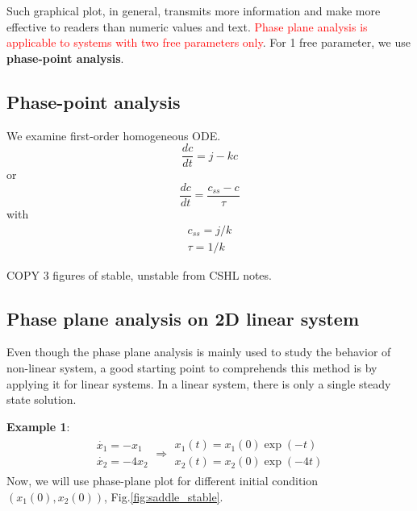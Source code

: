 
Such graphical plot, in general, transmits more information and make
more effective to readers than numeric values and text.
\textcolor{red}{Phase plane analysis is applicable to systems with two
  free parameters only}.
For 1 free parameter, we use {\bf phase-point analysis}.

\subsection{Phase-point analysis}
\label{sec:phase-point-analysis}

We examine first-order homogeneous ODE.
\begin{equation}
  \label{eq:667}
  \frac{dc}{dt} = j - kc
\end{equation}
or 
\begin{equation}
  \label{eq:669}
  \frac{dc}{dt} = \frac{c_{ss}-c}{\tau}
\end{equation}
with 
\begin{eqnarray*}
  c_{ss} = j/k \\
  \tau = 1/k
\end{eqnarray*}

COPY 3 figures of stable, unstable from CSHL notes.


\subsection{Phase plane analysis on 2D linear system}
\label{sec:phase-plane-analysis-1}

Even though the phase plane analysis is mainly used to study the
behavior of non-linear system, a good starting point to comprehends
this method is by applying it for linear systems. In a linear system,
there is only a single steady state solution.

{\bf Example 1}:
\begin{equation}
  \label{eq:106}
  \begin{split}
    \begin{array}{c}
          \dot{x_1} = -x_1 \\
    \dot{x_2} = -4x_2
    \end{array}
\Rightarrow 
\begin{array}{c}
  x_1(t) = x_1(0) \exp(-t) \\
  x_2(t) = x_2(0) \exp(-4t)
\end{array}
  \end{split}
\end{equation}
Now, we will use phase-plane plot for different initial condition
$(x_1(0),x_2(0))$, Fig.\ref{fig:saddle_stable}.

